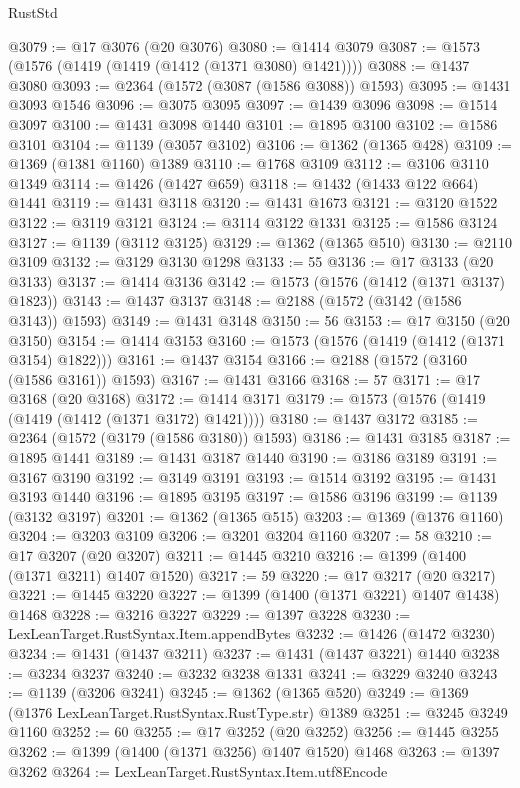 \begin{lexlean}{RustStd}
\begin{coremodule}
@3079 := @17 @3076 (@20 @3076)
@3080 := @1414 @3079
@3087 := @1573 (@1576 (@1419 (@1419 (@1412 (@1371 @3080) @1421))))
@3088 := @1437 @3080
@3093 := @2364 (@1572 (@3087 (@1586 @3088)) @1593)
@3095 := @1431 @3093 @1546
@3096 := @3075 @3095
@3097 := @1439 @3096
@3098 := @1514 @3097
@3100 := @1431 @3098 @1440
@3101 := @1895 @3100
@3102 := @1586 @3101
@3104 := @1139 (@3057 @3102)
@3106 := @1362 (@1365 @428)
@3109 := @1369 (@1381 @1160) @1389
@3110 := @1768 @3109
@3112 := @3106 @3110 @1349
@3114 := @1426 (@1427 @659)
@3118 := @1432 (@1433 @122 @664) @1441
@3119 := @1431 @3118
@3120 := @1431 @1673
@3121 := @3120 @1522
@3122 := @3119 @3121
@3124 := @3114 @3122 @1331
@3125 := @1586 @3124
@3127 := @1139 (@3112 @3125)
@3129 := @1362 (@1365 @510)
@3130 := @2110 @3109
@3132 := @3129 @3130 @1298
@3133 := 55
@3136 := @17 @3133 (@20 @3133)
@3137 := @1414 @3136
@3142 := @1573 (@1576 (@1412 (@1371 @3137) @1823))
@3143 := @1437 @3137
@3148 := @2188 (@1572 (@3142 (@1586 @3143)) @1593)
@3149 := @1431 @3148
@3150 := 56
@3153 := @17 @3150 (@20 @3150)
@3154 := @1414 @3153
@3160 := @1573 (@1576 (@1419 (@1412 (@1371 @3154) @1822)))
@3161 := @1437 @3154
@3166 := @2188 (@1572 (@3160 (@1586 @3161)) @1593)
@3167 := @1431 @3166
@3168 := 57
@3171 := @17 @3168 (@20 @3168)
@3172 := @1414 @3171
@3179 := @1573 (@1576 (@1419 (@1419 (@1412 (@1371 @3172) @1421))))
@3180 := @1437 @3172
@3185 := @2364 (@1572 (@3179 (@1586 @3180)) @1593)
@3186 := @1431 @3185
@3187 := @1895 @1441
@3189 := @1431 @3187 @1440
@3190 := @3186 @3189
@3191 := @3167 @3190
@3192 := @3149 @3191
@3193 := @1514 @3192
@3195 := @1431 @3193 @1440
@3196 := @1895 @3195
@3197 := @1586 @3196
@3199 := @1139 (@3132 @3197)
@3201 := @1362 (@1365 @515)
@3203 := @1369 (@1376 @1160)
@3204 := @3203 @3109
@3206 := @3201 @3204 @1160
@3207 := 58
@3210 := @17 @3207 (@20 @3207)
@3211 := @1445 @3210
@3216 := @1399 (@1400 (@1371 @3211) @1407 @1520)
@3217 := 59
@3220 := @17 @3217 (@20 @3217)
@3221 := @1445 @3220
@3227 := @1399 (@1400 (@1371 @3221) @1407 @1438) @1468
@3228 := @3216 @3227
@3229 := @1397 @3228
@3230 := LexLeanTarget.RustSyntax.Item.appendBytes
@3232 := @1426 (@1472 @3230)
@3234 := @1431 (@1437 @3211)
@3237 := @1431 (@1437 @3221) @1440
@3238 := @3234 @3237
@3240 := @3232 @3238 @1331
@3241 := @3229 @3240
@3243 := @1139 (@3206 @3241)
@3245 := @1362 (@1365 @520)
@3249 := @1369 (@1376 LexLeanTarget.RustSyntax.RustType.str) @1389
@3251 := @3245 @3249 @1160
@3252 := 60
@3255 := @17 @3252 (@20 @3252)
@3256 := @1445 @3255
@3262 := @1399 (@1400 (@1371 @3256) @1407 @1520) @1468
@3263 := @1397 @3262
@3264 := LexLeanTarget.RustSyntax.Item.utf8Encode

\end{coremodule}
\end{lexlean}
